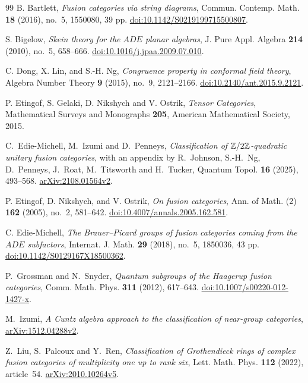 \begin{thebibliography}{99}
B. Bartlett, \emph{Fusion categories via string diagrams},
Commun. Contemp. Math. \textbf{18} (2016), no.~5, 1550080, 39 pp.
\href{https://doi.org/10.1142/S0219199715500807}{doi:10.1142/S0219199715500807}.

S. Bigelow, \emph{Skein theory for the $ADE$ planar algebras},
J. Pure Appl. Algebra \textbf{214} (2010), no.~5, 658--666.
\href{https://doi.org/10.1016/j.jpaa.2009.07.010}{doi:10.1016/j.jpaa.2009.07.010}.

C. Dong, X. Lin, and S.-H. Ng, \emph{Congruence property in conformal
field theory}, Algebra Number Theory \textbf{9} (2015), no.~9, 2121--2166.
\href{https://doi.org/10.2140/ant.2015.9.2121}{doi:10.2140/ant.2015.9.2121}.

 P. Etingof, S. Gelaki, D. Nikshych and V. Ostrik,
\emph{Tensor Categories}, Mathematical Surveys and Monographs \textbf{205},
American Mathematical Society, 2015.

C.~Edie-Michell, M.~Izumi and D.~Penneys,
\emph{Classification of $\mathbb Z/2\mathbb Z$-quadratic unitary fusion categories},
with an appendix by R.~Johnson, S.-H.~Ng, D.~Penneys, J.~Roat,
M.~Titsworth and H.~Tucker,
Quantum Topol. \textbf{16} (2025), 493--568.
\href{https://arxiv.org/abs/2108.01564v2}{arXiv:2108.01564v2}.

P. Etingof, D. Nikshych, and V. Ostrik, \emph{On fusion categories},
Ann. of Math. (2) \textbf{162} (2005), no.~2, 581--642.
\href{https://doi.org/10.4007/annals.2005.162.581}{doi:10.4007/annals.2005.162.581}.

C. Edie-Michell, \emph{The Brauer--Picard groups of fusion categories
coming from the $ADE$ subfactors},
Internat. J. Math. \textbf{29} (2018), no.~5, 1850036, 43 pp.
\href{https://doi.org/10.1142/S0129167X18500362}{doi:10.1142/S0129167X18500362}.

P.~Grossman and N.~Snyder,
\emph{Quantum subgroups of the Haagerup fusion categories},
Comm. Math. Phys. \textbf{311} (2012), 617--643.
\href{https://doi.org/10.1007/s00220-012-1427-x}{doi:10.1007/s00220-012-1427-x}.

M.~Izumi, \emph{A Cuntz algebra approach to the classification of near-group categories},
\href{https://arxiv.org/abs/1512.04288v2}{arXiv:1512.04288v2}.

Z.~Liu, S.~Palcoux and Y.~Ren,
\emph{Classification of Grothendieck rings of complex fusion categories
of multiplicity one up to rank six},
Lett. Math. Phys. \textbf{112} (2022), article~54.
\href{https://arxiv.org/abs/2010.10264v5}{arXiv:2010.10264v5}.


\end{thebibliography}
